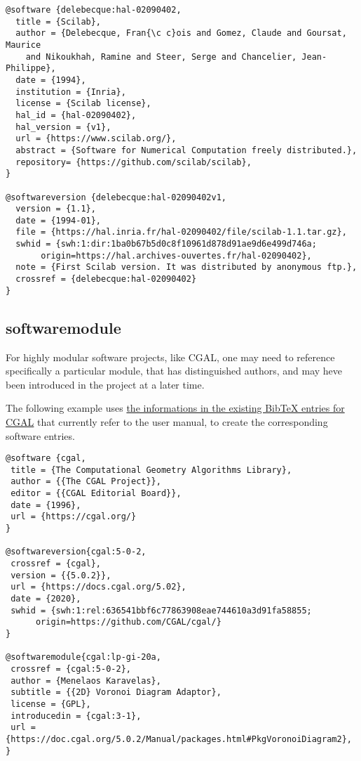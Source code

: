 \begin{verbatim}
@software {delebecque:hal-02090402,
  title = {Scilab},
  author = {Delebecque, Fran{\c c}ois and Gomez, Claude and Goursat, Maurice 
    and Nikoukhah, Ramine and Steer, Serge and Chancelier, Jean-Philippe},
  date = {1994},
  institution = {Inria},
  license = {Scilab license},
  hal_id = {hal-02090402},
  hal_version = {v1},
  url = {https://www.scilab.org/},
  abstract = {Software for Numerical Computation freely distributed.},
  repository= {https://github.com/scilab/scilab},
}

@softwareversion {delebecque:hal-02090402v1,
  version = {1.1},
  date = {1994-01},
  file = {https://hal.inria.fr/hal-02090402/file/scilab-1.1.tar.gz},
  swhid = {swh:1:dir:1ba0b67b5d0c8f10961d878d91ae9d6e499d746a;
	   origin=https://hal.archives-ouvertes.fr/hal-02090402},
  note = {First Scilab version. It was distributed by anonymous ftp.},
  crossref = {delebecque:hal-02090402}
}
\end{verbatim}

\subsection{softwaremodule}

For highly modular software projects, like CGAL, one may need to 
reference specifically a particular module, that has distinguished
authors, and may heve been introduced in the project at a later time.


The following example uses \href{https://doc.cgal.org/latest/Manual/how\_to\_cite\_cgal.bib}{the informations in the existing BibTeX entries for CGAL}
that currently refer to the user manual, to create the corresponding software entries.

\begin{verbatim}
@software {cgal,
 title = {The Computational Geometry Algorithms Library},
 author = {{The CGAL Project}},
 editor = {{CGAL Editorial Board}},
 date = {1996},
 url = {https://cgal.org/}
}

@softwareversion{cgal:5-0-2,
 crossref = {cgal},
 version = {{5.0.2}},
 url = {https://docs.cgal.org/5.02},
 date = {2020},
 swhid = {swh:1:rel:636541bbf6c77863908eae744610a3d91fa58855;
	  origin=https://github.com/CGAL/cgal/}
}

@softwaremodule{cgal:lp-gi-20a,
 crossref = {cgal:5-0-2},
 author = {Menelaos Karavelas},
 subtitle = {{2D} Voronoi Diagram Adaptor},
 license = {GPL},
 introducedin = {cgal:3-1},
 url = {https://doc.cgal.org/5.0.2/Manual/packages.html#PkgVoronoiDiagram2},
}
\end{verbatim}

